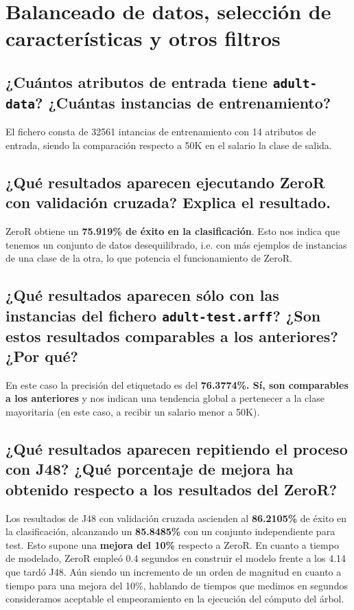\documentclass[12pt]{article}
\begin{document}
\newpage

\section{Balanceado de datos, selección de características y otros filtros}

\subsection*{\small ¿Cuántos atributos de entrada tiene \texttt{adult-data}? ¿Cuántas instancias de entrenamiento?}

El fichero consta de 32561 intancias de entrenamiento con 14 atributos de entrada, siendo la comparación respecto a 50K en el salario la clase de salida.

\subsection*{\small ¿Qué resultados aparecen ejecutando ZeroR con validación cruzada? Explica el resultado.}

ZeroR obtiene un \textbf{75.919\% de éxito en la clasificación}. Esto nos indica que tenemos un conjunto de datos desequilibrado, i.e. con más ejemplos de instancias de una clase de la otra, lo que potencia el funcionamiento de ZeroR.

\subsection*{\small ¿Qué resultados aparecen sólo con las instancias del fichero \texttt{adult-test.arff}? ¿Son estos resultados comparables a los anteriores? ¿Por qué?}

En este caso la precisión del etiquetado es del \textbf{76.3774\%. Sí, son comparables a los anteriores} y nos indican una tendencia global a pertenecer a la clase mayoritaria (en este caso, a recibir un salario menor a 50K).

\subsection*{\small ¿Qué resultados aparecen repitiendo el proceso con J48? ¿Qué porcentaje de mejora ha obtenido respecto a los resultados del ZeroR?}

Los resultados de J48 con validación cruzada ascienden al \textbf{86.2105\%} de éxito en la clasificación, alcanzando un \textbf{85.8485\%} con un conjunto independiente para test. Esto supone una \textbf{mejora del 10\%} respecto a ZeroR. En cuanto a tiempo de modelado, ZeroR empleó 0.4 segundos en construir el modelo frente a los 4.14 que tardó J48. Aún siendo un incremento de un orden de magnitud en cuanto a tiempo para una mejora del 10\%, hablando de tiempos que medimos en segundos consideramos aceptable el empeoramiento en la ejecución del cómputo del árbol.
\end{document}
